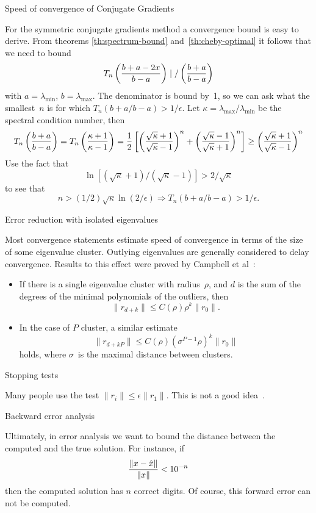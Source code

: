 \documentclass[11pt]{artikel3}
\begin{document}
\begin{Outline}
 {Speed of convergence of Conjugate Gradients}

For the symmetric conjugate gradients method a convergence bound is
easy to derive. From theorems \ref{th:spectrum-bound}
and~\ref{th:cheby-optimal} it follows that we need to bound
\[ T_n\left({b+a-2x\over b-a}\right)\mid/\left({b+a\over b-a}\right)
\]
with $a=\lambda_{\min}$, $b=\lambda_{\max}$. The denominator is bound
by~1, so we can ask what the smallest~$n$ is for which
$T_n(b+a/b-a)>1/\epsilon$. Let $\kappa=\lambda_{\max}/\lambda_{\min}$
be the spectral condition number, then
\[ T_n\left({b+a\over b-a}\right)=T_n\left({\kappa+1\over\kappa-1}\right)  
  ={1\over2}\left[\left({\sqrt\kappa+1\over\sqrt\kappa-1}\right)^n +
                  \left({\sqrt\kappa-1\over\sqrt\kappa+1}\right)^n\right]
  \geq \left({\sqrt\kappa+1\over\sqrt\kappa-1}\right)^n \]
Use the fact that
\[ \ln[(\sqrt\kappa+1)/(\sqrt\kappa-1)]>2/\sqrt\kappa \]
to see that
\[ n>(1/2)\sqrt\kappa \ln(2/\epsilon) \Rightarrow
    T_n(b+a/b-a)>1/\epsilon . \]

 {Error reduction with isolated eigenvalues}

Most convergence statements estimate speed of convergence in terms of
the size of some eigenvalue cluster. Outlying eigenvalues are
generally considered to delay convergence. Results to this effect were
proved by Campbell et al~\cite{Campbell:gmres-minimalp}:
\begin{itemize}
\item If there is a single eigenvalue cluster with radius~$\rho$, and
  $d$ is the sum of the degrees of the minimal polynomials of the
  outliers, then
  \[ \|r_{d+k}\|\leq C(\rho)\rho^k\|r_0\|. \]
\item In the case of $P$ cluster, a similar estimate
  \[ \|r_{d+kP}\|\leq C(\rho)(\sigma^{P-1}\rho)^k\|r_0\| \]
  holds, where $\sigma$~is the maximal distance between clusters.
\end{itemize}

 {Stopping tests}

Many people use the test $\|r_i\|\leq\epsilon\|r_1\|$. This is not a
good idea~\cite{Ba:templates,Kaas:termination,Ashby:termination}.

 {Backward error analysis}

Ultimately, in error analysis we want to bound the distance between
the computed and the true solution. For instance, if 
\[ {\|x-\hat x\|\over \|x\|}<10^{-n} \]
then the computed solution has $n$ correct digits.
Of course, this forward error can not be
computed.


\end{Outline}
\end{document}
